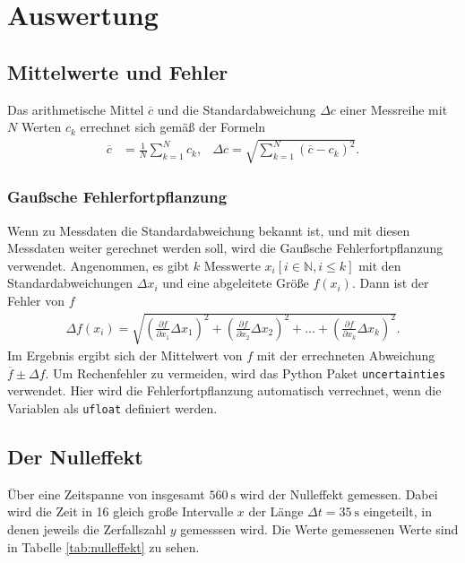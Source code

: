 \section{Auswertung}

\subsection{Mittelwerte und Fehler}
Das arithmetische Mittel $\overline{c}$ und die Standardabweichung $\Delta c$ einer Messreihe mit $N$ Werten $c_k$ errechnet sich gemäß der Formeln
\begin{align}
    \overline{c} &= \frac{1}{N} \sum_{k=1}^{N} c_k, & \Delta c = \sqrt{ \sum_{k=1}^{N} \left(\overline{c} - c_k \right)^2 }.
    \label{eq:mittelstand}
\end{align}

\subsubsection{Gaußsche Fehlerfortpflanzung}
Wenn zu Messdaten die Standardabweichung bekannt ist, und mit diesen Messdaten weiter gerechnet werden soll,
wird die Gaußsche Fehlerfortpflanzung verwendet. 
Angenommen, es gibt $k$ Messwerte $x_i [i \in \mathbb{N}, i \leq k]$ mit den Standardabweichungen $\Delta x_i$
und eine abgeleitete Größe $f(x_i)$.
Dann ist der Fehler von $f$
\begin{align}
    \Delta f(x_i) = \sqrt{
    \left(\frac{\partial f}{\partial x_1} \Delta x_1\right)^2%
     + \left(\frac{\partial f}{\partial x_2} \Delta x_2\right)^2%
     + \dots%
     + \left(\frac{\partial f}{\partial x_k} \Delta x_k\right)^2%
    }.
    \label{eq:gauss}
\end{align} 
Im Ergebnis ergibt sich der Mittelwert von $f$ mit der errechneten Abweichung $\overline{f} \pm \Delta f $.
Um Rechenfehler zu vermeiden, wird das Python \cite[]{python} Paket \texttt{uncertainties} \cite[][]{uncertainties} verwendet.
Hier wird die Fehlerfortpflanzung automatisch verrechnet, wenn die Variablen als \texttt{ufloat} definiert werden.





\subsection{Der Nulleffekt}
\label{sec:ausw_null}
Über eine Zeitspanne von insgesamt $\qty[]{560}{\second}$ wird der Nulleffekt gemessen.
Dabei wird die Zeit in 16 gleich große Intervalle $x$ der Länge $\Delta t = \qty[]{35}{\second}$ eingeteilt, in denen jeweils die 
Zerfallszahl $y$ gemesssen wird. 
Die Werte gemessenen Werte sind in Tabelle \ref{tab:nulleffekt} zu sehen.

